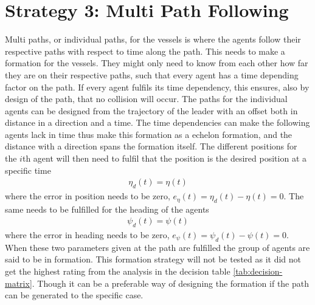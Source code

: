 \section{Strategy 3: Multi Path Following}
Multi paths, or individual paths, for the vessels is where the agents follow their respective paths with respect to time along the path. This needs to make a formation for the vessels. They might only need to know from each other how far they are on their respective paths, such that every agent has a time depending factor on the path. If every agent fulfils its time dependency, this ensures, also by design of the path, that no collision will occur. The paths for the individual agents can be designed from the trajectory of the leader with an offset both in distance in a direction and a time. The time dependencies can make the following agents lack in time thus make this formation as a echelon formation, and the distance with a direction spans the formation itself. The different positions for the $i$th agent will then need to fulfil that the position is the desired position at a specific time
\begin{align}
\eta_d(t) = \eta(t)
\end{align}
where the error in position needs to be zero, $e_\eta(t) = \eta_d(t) - \eta(t) = 0$. The same needs to be fulfilled for the heading of the agents
\begin{align}
\psi_d(t) = \psi(t)
\end{align}
where the error in heading needs to be zero, $e_\psi(t) = \psi_d(t) - \psi(t) = 0$. When these two parameters given at the path are fulfilled the group of agents are said to be in formation. This formation strategy will not be tested as it did not get the highest rating from the analysis in the decision table \ref{tab:decision-matrix}. Though it can be a preferable way of designing the formation if the path can be generated to the specific case.